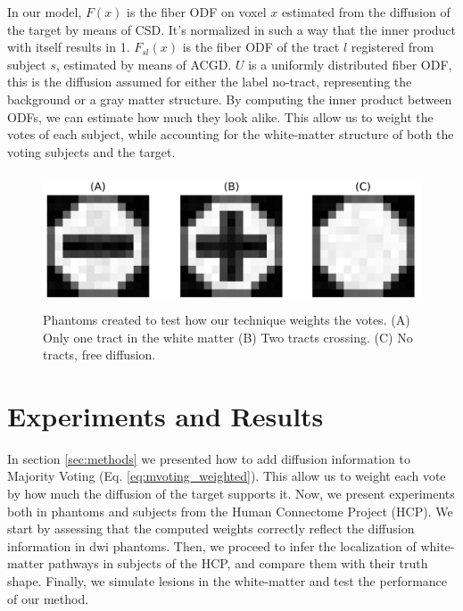 In our model, $F(x)$ is the fiber ODF on voxel $x$ estimated from the diffusion
of the target by means of CSD. It's normalized in such a way that the inner
product with itself results in 1. $F_{sl}(x)$ is the fiber ODF of the tract $l$
registered from subject $s$, estimated by means of ACGD. $U$ is a uniformly
distributed fiber ODF, this is the diffusion assumed for either the label 
no-tract, representing the background or a gray matter structure.
By computing the inner product between ODFs, we can estimate how much they look
alike. This allow us to weight the votes of each subject, while accounting for
the white-matter structure of both the voting subjects and the target.
\begin{figure}[t]
    \includegraphics[height=150px]{7.multiatlas/img/phantoms.png}
    \caption{Phantoms created to test how our technique weights the votes.
             (A) Only one tract in the white matter (B) Two tracts crossing. (C) No tracts, free diffusion.}
    \label{fig:pha_exp_1}
\end{figure}

\section{Experiments and Results}
In section \ref{sec:methods} we presented how to add diffusion information to
Majority Voting (Eq. \ref{eq:mvoting_weighted}). This allow us to weight each
vote by how much the diffusion of the target supports it. Now, we present
experiments both in phantoms and subjects from the Human Connectome 
Project (HCP). We start by assessing that the computed weights correctly reflect
the diffusion information in dwi phantoms. Then, we proceed to infer the localization
of white-matter pathways in subjects of the HCP, and compare them with their
truth shape. Finally, we simulate lesions in the white-matter and test the
performance of our method.

